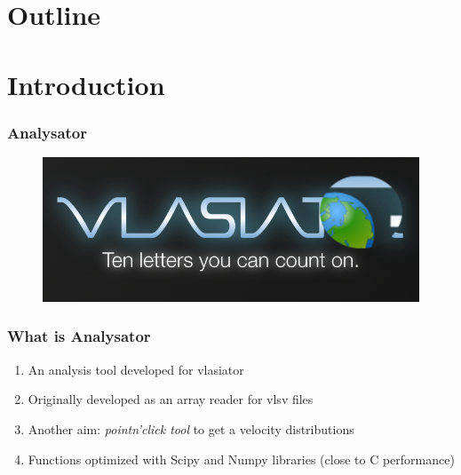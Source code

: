 \documentclass{beamer}
\begin{document}
\section*{Outline}
\begin{frame}
 \tableofcontents
\end{frame}

\section{Introduction}
\begin{frame}
 \frametitle{Analysator}
 \begin{figure}
  \centering
  \includegraphics[width=\textwidth]{../images/analysator.jpg}
  \label{fig:mayavi_example}
 \end{figure}
\end{frame}

\begin{frame}
 \frametitle{What is Analysator}
 \begin{enumerate}
  \item An analysis tool developed for vlasiator
  \item Originally developed as an array reader for vlsv files
  \item Another aim: \emph{pointn'click tool} to get a velocity distributions
  \item Functions optimized with Scipy and Numpy libraries (close to C performance)
 \end{enumerate}
\end{frame}
\end{document}
